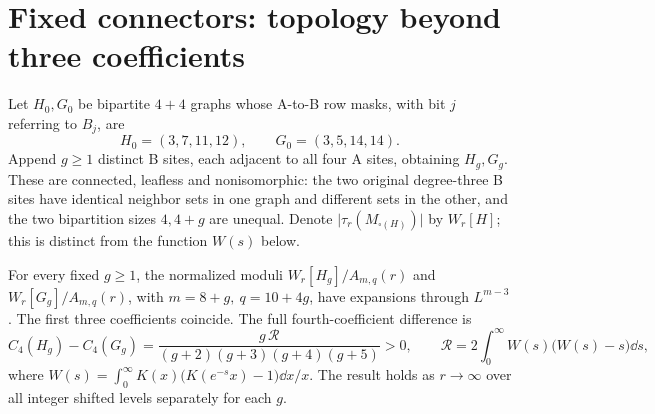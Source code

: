 \section{Fixed connectors: topology beyond three coefficients}\label{sec:fixed}
Let \(H_0,G_0\) be bipartite \(4+4\) graphs whose A-to-B row masks, with bit \(j\) referring to \(B_j\), are
\[
 H_0=(3,7,11,12),\qquad G_0=(3,5,14,14).
\]
Append \(g\ge1\) distinct B sites, each adjacent to all four A sites, obtaining \(H_g,G_g\). These are connected, leafless and nonisomorphic: the two original degree-three B sites have identical neighbor sets in one graph and different sets in the other, and the two bipartition sizes \(4,4+g\) are unequal. Denote \(\lvert\tau_r(M_{\square(H)})\rvert\) by \(W_r[H]\); this is distinct from the function \(W(s)\) below.

\begin{theorem}\label{thm:fixed}
For every fixed \(g\ge1\), the normalized moduli \(W_r[H_g]/A_{m,q}(r)\) and \(W_r[G_g]/A_{m,q}(r)\), with \(m=8+g,\ q=10+4g\), have expansions through \(L^{m-3}\). The first three coefficients coincide. The full fourth-coefficient difference is
\[
 C_4(H_g)-C_4(G_g)=\frac{g\,\mathcal R}{(g+2)(g+3)(g+4)(g+5)}>0,
 \qquad \mathcal R=2\int_0^\infty W(s)\bigl(W(s)-s\bigr)\dd s,
\]
where \(W(s)=\int_0^\infty K(x)\bigl(K(e^{-s}x)-1\bigr)\dd x/x\).
The result holds as \(r\to\infty\) over all integer shifted levels separately for each \(g\).
\end{theorem}

